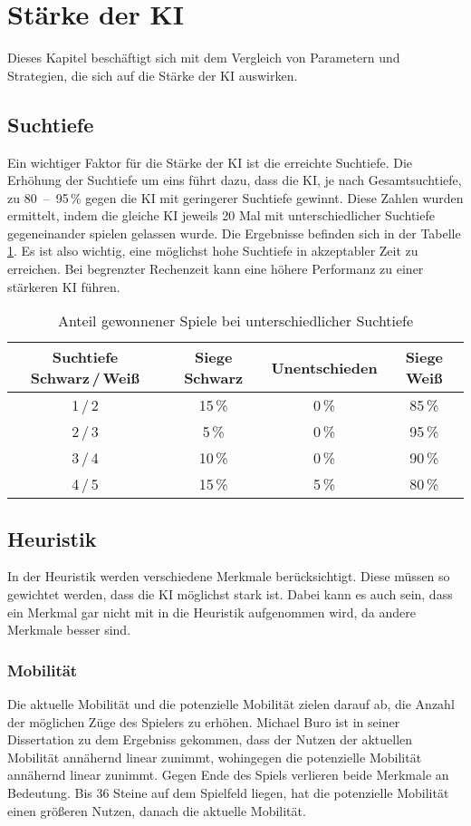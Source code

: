 \section{Stärke der KI}
Dieses Kapitel beschäftigt sich mit dem Vergleich von Parametern und Strategien, die sich auf die Stärke der KI auswirken.

\subsection{Suchtiefe}
Ein wichtiger Faktor für die Stärke der KI ist die erreichte Suchtiefe.
Die Erhöhung der Suchtiefe um eins führt dazu, dass die KI, je nach Gesamtsuchtiefe, zu 80~–~95\,\% gegen die KI mit geringerer Suchtiefe gewinnt.
Diese Zahlen wurden ermittelt, indem die gleiche KI jeweils 20 Mal mit unterschiedlicher Suchtiefe gegeneinander spielen gelassen wurde.
Die Ergebnisse befinden sich in der Tabelle \ref{table:search-depth}.
Es ist also wichtig, eine möglichst hohe Suchtiefe in akzeptabler Zeit zu erreichen.
Bei begrenzter Rechenzeit kann eine höhere Performanz zu einer stärkeren KI führen.

\begin{table}[hb]
    \centering
    \begin{tabular}{c|ccc}
    \hline
    Suchtiefe Schwarz\,/\,Weiß & Siege Schwarz & Unentschieden & Siege Weiß \\ \hline
    1\,/\,2  & 15\,\% &  0\,\% & 85\,\% \\
    2\,/\,3  &  5\,\% &  0\,\% & 95\,\% \\
    3\,/\,4  & 10\,\% &  0\,\% & 90\,\% \\
    4\,/\,5  & 15\,\% &  5\,\% & 80\,\% \\
    \hline
    \end{tabular}
    \caption{Anteil gewonnener Spiele bei unterschiedlicher Suchtiefe}
    \label{table:search-depth}
\end{table}

\subsection{Heuristik}
In der Heuristik werden verschiedene Merkmale berücksichtigt. Diese müssen so gewichtet werden, dass die KI möglichst
stark ist. Dabei kann es auch sein, dass ein Merkmal gar nicht mit in die Heuristik aufgenommen wird, da andere Merkmale
besser sind.

\subsubsection{Mobilität}
Die aktuelle Mobilität und die potenzielle Mobilität zielen darauf ab, die Anzahl der möglichen Züge des Spielers zu
erhöhen. Michael Buro ist in seiner Dissertation zu dem Ergebniss gekommen, dass der Nutzen der aktuellen Mobilität
annähernd linear zunimmt, wohingegen die potenzielle Mobilität annähernd linear zunimmt. Gegen Ende des Spiels verlieren
beide Merkmale an Bedeutung. Bis 36 Steine auf dem Spielfeld liegen, hat die potenzielle Mobilität einen größeren
Nutzen, danach die aktuelle Mobilität. \cite[S.~20]{evaluationfunctions}

